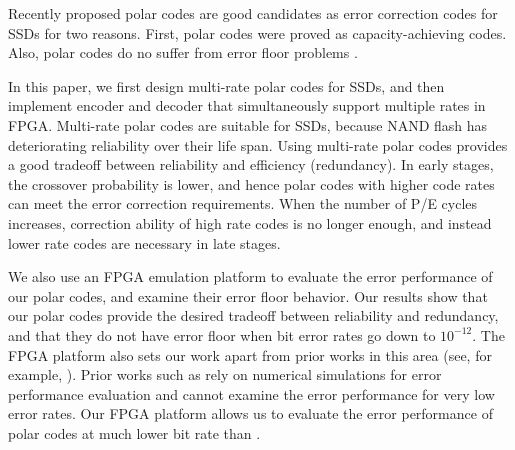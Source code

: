 \documentclass{article}
\begin{document}

Recently  proposed polar codes \cite{arikan2009channel} are good candidates as error correction codes for SSDs for two reasons. First, polar codes were proved as capacity-achieving codes. Also, polar codes do no suffer from error floor problems \cite{Eslami2012On}.
 
In this paper, we first design multi-rate polar codes for SSDs, and then implement encoder and decoder that simultaneously support multiple rates in FPGA. Multi-rate polar codes are suitable for SSDs, because NAND flash has deteriorating reliability over their life span. Using multi-rate polar codes provides a good tradeoff between reliability and efficiency (redundancy). In early stages, the crossover probability is lower, and hence polar codes with higher code rates can meet the error correction requirements. When the number of P/E cycles increases, correction ability of high rate codes is no longer enough, and instead lower rate codes are necessary in late stages.

We also use an FPGA emulation platform to evaluate the error performance of our polar codes, and examine their error floor behavior. Our results show that our polar codes provide the desired tradeoff between reliability and redundancy, and that they do not have error floor when bit error rates go down to $10^{-12}$. The FPGA platform also sets our work apart from prior works in this area (see, for example, \cite{li2015study}). Prior works such as \cite{li2015study} rely on numerical simulations for error performance evaluation and cannot examine the error performance for very low error rates. Our FPGA platform allows us to evaluate the error performance of polar codes at much lower bit rate than \cite{li2015study}.
 
 
\end{document}
